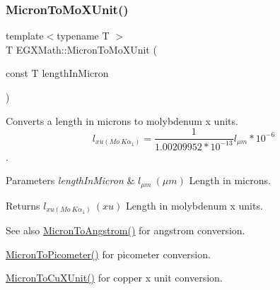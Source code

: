 \subsubsection{\texorpdfstring{Micron\+To\+Mo\+X\+Unit()}{MicronToMoXUnit()}}
{\footnotesize\ttfamily template$<$typename T $>$ \\
T E\+G\+X\+Math\+::\+Micron\+To\+Mo\+X\+Unit (\begin{DoxyParamCaption}\item[{const T}]{length\+In\+Micron }\end{DoxyParamCaption})}



Converts a length in microns to molybdenum x units. \[ l_{xu(Mo\ K\alpha_1)}=\frac{1}{1.00209952*10^{-13}} l_{\mu m} * 10^{-6}\]. 


\begin{DoxyParams}{Parameters}
{\em length\+In\+Micron} & $ l_{\mu m}\ (\mu m)$ Length in microns. \\
\hline
\end{DoxyParams}
\begin{DoxyReturn}{Returns}
$ l_{xu(Mo\ K\alpha_1)}\ (xu)$ Length in molybdenum x units. 
\end{DoxyReturn}
\begin{DoxySeeAlso}{See also}
\mbox{\hyperlink{group___e_g_x_math-_conversions-_length_conversions-_non-_s_i-_micron-_non-_s_i_ga34f8c07bfb65b584298dd7be114b85ad}{Micron\+To\+Angstrom()}} for angstrom conversion. 

\mbox{\hyperlink{group___e_g_x_math-_conversions-_length_conversions-_non-_s_i-_micron-_s_i_ga6e091e653fd9efb8769cc131fcbc41bc}{Micron\+To\+Picometer()}} for picometer conversion. 

\mbox{\hyperlink{group___e_g_x_math-_conversions-_length_conversions-_non-_s_i-_micron-_non-_s_i_gaa582745d86b8b016faa9ad442b18ce8f}{Micron\+To\+Cu\+X\+Unit()}} for copper x unit conversion. 
\end{DoxySeeAlso}
